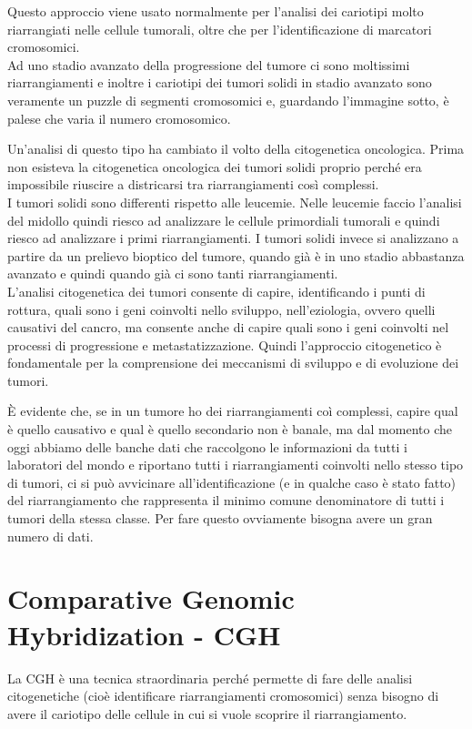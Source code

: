 \documentclass[11pt]{book}
\begin{document}
Questo approccio viene usato normalmente per l’analisi dei cariotipi molto riarrangiati nelle cellule tumorali, oltre che per l’identificazione di marcatori cromosomici.\\
Ad uno stadio avanzato della progressione del tumore ci sono moltissimi riarrangiamenti e inoltre i cariotipi dei tumori solidi in stadio avanzato sono veramente un puzzle di segmenti cromosomici e, guardando l’immagine sotto, è palese che varia il numero cromosomico. 

Un’analisi di questo tipo ha cambiato il volto della citogenetica oncologica. Prima non esisteva la citogenetica oncologica dei tumori solidi proprio perché era impossibile riuscire a districarsi tra riarrangiamenti così complessi.\\
I tumori solidi sono differenti rispetto alle leucemie. Nelle leucemie faccio l’analisi del midollo quindi riesco ad analizzare le cellule primordiali tumorali e quindi riesco ad analizzare i primi riarrangiamenti. I tumori solidi invece si analizzano a partire da un prelievo bioptico del tumore, quando già è in uno stadio abbastanza avanzato e quindi quando già ci sono tanti riarrangiamenti.\\
L’analisi citogenetica dei tumori consente di capire, identificando i punti di rottura, quali sono i geni coinvolti nello sviluppo, nell’eziologia, ovvero quelli causativi del cancro, ma consente anche di capire quali sono i geni coinvolti nel processi di progressione e metastatizzazione. Quindi l’approccio citogenetico è fondamentale per la comprensione dei meccanismi di sviluppo e di evoluzione dei tumori.

È evidente che, se in un tumore ho dei riarrangiamenti coì complessi, capire qual è quello causativo e qual è quello secondario non è banale, ma dal momento che oggi abbiamo delle banche dati che raccolgono le informazioni da tutti i laboratori del mondo e riportano tutti i riarrangiamenti coinvolti nello stesso tipo di tumori, ci si può avvicinare all’identificazione (e in qualche caso è stato fatto) del riarrangiamento che rappresenta il minimo comune denominatore di tutti i tumori della stessa classe. Per fare questo ovviamente bisogna avere un gran numero di dati.


\section{Comparative Genomic Hybridization - CGH}
La CGH è una tecnica straordinaria perché permette di fare delle analisi citogenetiche (cioè identificare riarrangiamenti cromosomici) senza bisogno di avere il cariotipo delle cellule in cui si vuole scoprire il riarrangiamento. 
\end{document}
